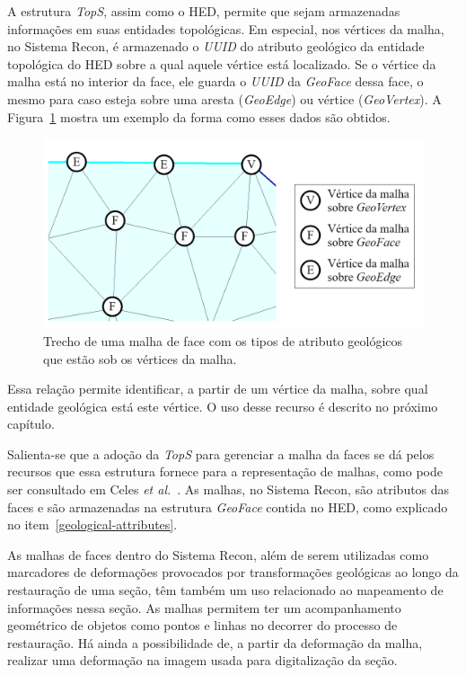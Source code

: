 A estrutura \emph{TopS}, assim como o HED, permite que sejam armazenadas informações em suas entidades topológicas. Em especial, nos vértices da malha, no Sistema Recon, é armazenado o \textit{UUID} do atributo geológico da entidade topológica do HED sobre a qual aquele vértice está localizado. Se o vértice da malha está no interior da face, ele guarda o \textit{UUID} da \textit{GeoFace} dessa face, o mesmo para caso esteja sobre uma aresta (\textit{GeoEdge}) ou vértice (\textit{GeoVertex}). A Figura~\ref{fig-recon-4} mostra um exemplo da forma como esses dados são obtidos.

\begin{figure} [H]
  \begin{center}
    \includegraphics[width=\textwidth]{images/fig-recon-4}
    \caption{Trecho de uma malha de face com os tipos de atributo geológicos que estão sob os vértices da malha.}\label{fig-recon-4}
  \end{center}
\end{figure}

Essa relação permite identificar, a partir de um vértice da malha, sobre qual entidade geológica está este vértice. O uso desse recurso é descrito no próximo capítulo.

Salienta-se que a adoção da \emph{TopS} para gerenciar a malha da faces se dá pelos recursos que essa estrutura fornece para a representação de malhas, como pode ser consultado em Celes \emph{et al.}~\cite{Tops}. As malhas, no Sistema Recon, são atributos das faces e são armazenadas na estrutura \emph{GeoFace} contida no HED, como explicado no item~\ref{geological-attributes}.

As malhas de faces dentro do Sistema Recon, além de serem utilizadas como marcadores de deformações provocados por transformações geológicas ao longo da restauração de uma seção, têm também um uso relacionado ao mapeamento de informações nessa seção. As malhas permitem ter um acompanhamento geométrico de objetos como pontos e linhas no decorrer do processo de restauração. Há ainda a possibilidade de, a partir da deformação da malha, realizar uma deformação na imagem usada para digitalização da seção.

